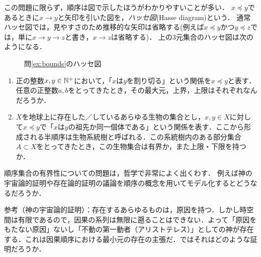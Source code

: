 \documentclass[dvipdfmx,11pt,a4paper]{jsarticle}
\begin{document}
この問題に限らず，順序は図で示したほうがわかりやすいことが多い．
$x \preceq y$であるときに$x \to y$と矢印を引いた図を，\emph{ハッセ図}(Hasse diagram)という．
通常ハッセ図では，見やすさのため推移的な矢印は省略する(例えば$x \preceq y$かつ$y \preceq z$では，単に$x \to y \to z$と書き，$x \to z$は省略する)．
上の3元集合のハッセ図は次のようになる．
\begin{figure}[h]
\centering
{}
\caption{問\ref{ex:bounds}のハッセ図}
\label{fig:hasse} 
\end{figure}

\begin{exercise}
\begin{enumerate}
  \item 正の整数$x, y \in \mathbb{N}^+$において，「$x$は$y$を割り切る」という関係を$x \preceq y$と表す．
  任意の正整数$a,b$をとってきたとき，その最大元，上界，上限はそれぞれなんだろうか．
  \item $X$を地球上に存在した／しているあらゆる生物の集合とし，$x, y \in X$に対して$x \preceq y$で「$x$は$y$の祖先か同一個体である」という関係を表す．ここから形成される半順序は生物系統樹と呼ばれる．この系統樹内のある部分集合$A \subset X$をとってきたとき，この生物集合は有界か，また上限・下限を持つか．
\end{enumerate}
\end{exercise}


\begin{example}
順序集合の有界性についての問題は，哲学で非常によく出くわす．
例えば神の宇宙論的証明や存在論的証明の議論を順序の概念を用いてモデル化するとどうなるだろうか．

参考（神の宇宙論的証明）：存在するあらゆるものは，原因を持つ．しかし時空間は有限であるので，因果の系列は無限に遡ることはできない．よって「原因をもたない原因」ないし「不動の第一動者（アリストテレス）」としての神が存在する．これは因果順序における最小元の存在の主張だ．ではそれはどのような証明だろうか．
\end{example}
\end{document}
